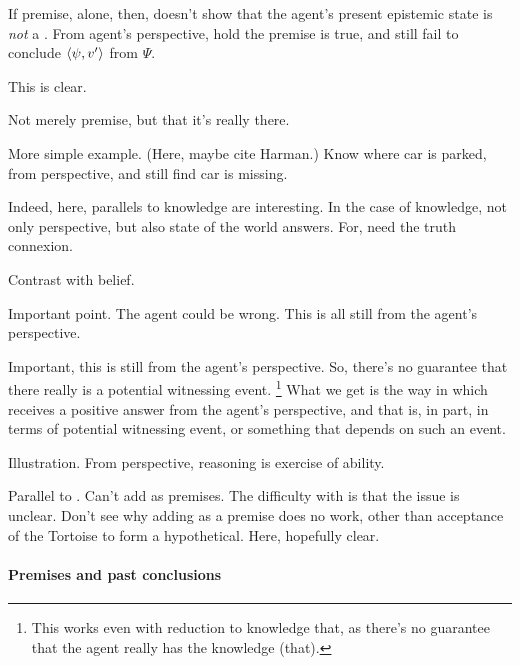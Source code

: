\begin{note}
  \begin{argument}
    If premise, alone, then, doesn't show that the agent's present epistemic state is \emph{not} a \deadEnd{}.
    From agent's perspective, hold the premise is true, and still fail to conclude \(\langle \psi, v' \rangle\) from \(\Psi\).

    This is clear.

    Not merely premise, but that it's really there.

    More simple example.
    (Here, maybe cite Harman.)
    Know where car is parked, from perspective, and still find car is missing.

    Indeed, here, parallels to knowledge are interesting.
    In the case of knowledge, not only perspective, but also state of the world answers.
    For, need the truth connexion.

    Contrast with belief.

    Important point.
    The agent could be wrong.
    This is all still from the agent's perspective.
  \end{argument}

  Important, this is still from the agent's perspective.
  So, there's no guarantee that there really is a potential witnessing event.%
  \footnote{
    This works even with reduction to knowledge that, as there's no guarantee that the agent really has the knowledge (that).
  }
  What we get is the way in which \qzS{} receives a positive answer from the agent's perspective, and that is, in part, in terms of potential witnessing event, or something that depends on such an event.
\end{note}

\begin{note}
  Illustration.
  From perspective, reasoning is exercise of ability.
\end{note}

\begin{note}
  {
    \color{green}
    Parallel to \citeauthor{Carroll:1895uj}.
    Can't add as premises.
    The difficulty with \citeauthor{Carroll:1895uj} is that the issue is unclear.
    Don't see why adding as a premise does no work, other than acceptance of the Tortoise to form a hypothetical.
    Here, hopefully clear.
  }
\end{note}

\paragraph{Premises and past conclusions}

